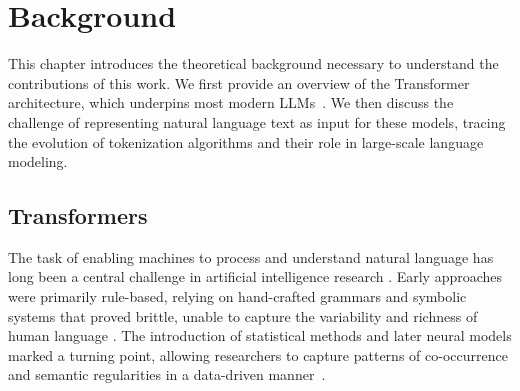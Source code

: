 
\chapter{Background}


\label{Section2}\label{chap:background}

This chapter introduces the theoretical background necessary to understand the contributions of this work. 
We first provide an overview of the Transformer architecture, which underpins most modern LLMs~\cite{minaee2024large}. 
We then discuss the challenge of representing natural language text as input for these models, tracing the evolution of tokenization algorithms and their role in large-scale language modeling.


\section{Transformers}\label{Section2.2}

The task of enabling machines to process and understand natural language has long been a central challenge in artificial intelligence research \cite{harris1954distributional}.
Early approaches were primarily rule-based, relying on hand-crafted grammars and symbolic systems that proved brittle, unable to capture the variability and richness of human language \cite{winograd1972understanding}.
The introduction of statistical methods and later neural models marked a turning point, allowing researchers to capture patterns of co-occurrence and semantic regularities in a data-driven manner~\cite{bengio2003neural}.

